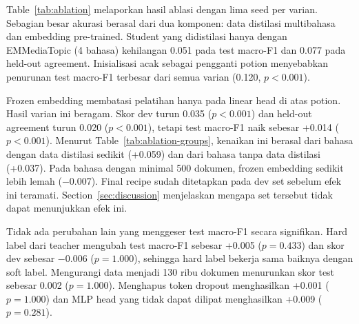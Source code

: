 \documentclass[journal]{IEEEtran}
\begin{document}
\begin{table}[!t]
\caption{Macro-F1 of Selected Variants by the Amount of Distillation Data in the Language of the Article (Test Set, Mean Over Seeds)}
\label{tab:ablation-groups}
\centering
\footnotesize
\setlength{\tabcolsep}{3pt}
\end{table}
Table~\ref{tab:ablation} melaporkan hasil ablasi dengan lima seed per varian. Sebagian besar akurasi berasal dari dua komponen: data distilasi multibahasa dan embedding pre-trained. Student yang didistilasi hanya dengan EMMediaTopic (4 bahasa) kehilangan 0.051 pada test macro-F1 dan 0.077 pada held-out agreement. Inisialisasi acak sebagai pengganti potion menyebabkan penurunan test macro-F1 terbesar dari semua varian (0.120, $p<0.001$).

Frozen embedding membatasi pelatihan hanya pada linear head di atas potion. Hasil varian ini beragam. Skor dev turun 0.035 ($p<0.001$) dan held-out agreement turun 0.020 ($p<0.001$), tetapi test macro-F1 naik sebesar +0.014 ($p<0.001$). Menurut Table~\ref{tab:ablation-groups}, kenaikan ini berasal dari bahasa dengan data distilasi sedikit (+0.059) dan dari bahasa tanpa data distilasi (+0.037). Pada bahasa dengan minimal 500 dokumen, frozen embedding sedikit lebih lemah ($-$0.007). Final recipe sudah ditetapkan pada dev set sebelum efek ini teramati. Section~\ref{sec:discussion} menjelaskan mengapa set tersebut tidak dapat menunjukkan efek ini.

Tidak ada perubahan lain yang menggeser test macro-F1 secara signifikan. Hard label dari teacher mengubah test macro-F1 sebesar +0.005 ($p=0.433$) dan skor dev sebesar $-$0.006 ($p=1.000$), sehingga hard label bekerja sama baiknya dengan soft label. Mengurangi data menjadi 130 ribu dokumen menurunkan skor test sebesar 0.002 ($p=1.000$). Menghapus token dropout menghasilkan +0.001 ($p=1.000$) dan MLP head yang tidak dapat dilipat menghasilkan +0.009 ($p=0.281$).
\end{document}
